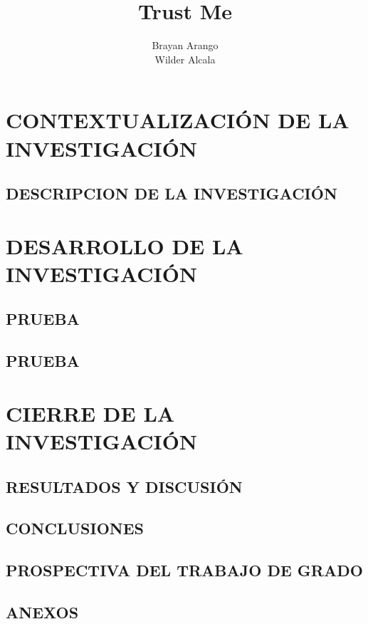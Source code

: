 \documentclass[12pt,letterpaper,oneside]{report}
\title{Trust Me}
\author{{Brayan Arango} \\ {Wilder Alcala}}
\begin{document}
	
	
	

	
	
	
	\tableofcontents
	
	
	
	\part{CONTEXTUALIZACIÓN DE LA INVESTIGACIÓN}
	
		\chapter{DESCRIPCION DE LA INVESTIGACIÓN}
			
			
			
			
			
			
			
			
			
			
	\part{DESARROLLO DE LA INVESTIGACIÓN}

		\chapter{PRUEBA}
			
			
			
		\chapter{PRUEBA}
			
			

	\part{CIERRE DE LA INVESTIGACIÓN}

		\chapter{RESULTADOS Y DISCUSIÓN}
			
			

		\chapter{CONCLUSIONES}
			
			
			
		\chapter{PROSPECTIVA DEL TRABAJO DE GRADO}
			
			
			
	
	
	
	\chapter*{ANEXOS}
		
	
\end{document}
